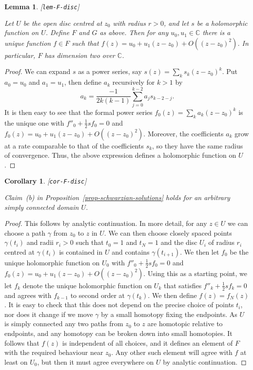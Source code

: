 \documentclass[reqno]{amsart}
\newcommand{\lbl}[1]{\label{#1}\textup{[\texttt{#1}]}\par}
\newcommand{\lbl}{\label}
\newcommand{\gm}        {\gamma}
\newcommand{\C}         {{\mathbb{C}}}
\newcommand{\half}      {\tfrac{1}{2}}
\renewcommand{\:}{\colon}
\newtheorem{lemma}[theorem]{Lemma}
\newtheorem{corollary}[theorem]{Corollary}
\theoremstyle{definition}
\begin{document}
\begin{lemma}\lbl{lem-F-disc}
 Let $U$ be the open disc centred at $z_0$ with radius $r>0$, and let
 $s$ be a holomorphic function on $U$.  Define $F$ and $G$ as above.
 Then for any $u_0,u_1\in\C$ there is a unique function $f\in F$ such
 that $f(z)=u_0+u_1(z-z_0)+O((z-z_0)^2)$.  In particular, $F$ has
 dimension two over $\C$.
\end{lemma}
\begin{proof}
 We can expand $s$ as a power series, say $s(z)=\sum_ks_k(z-z_0)^k$.
 Put $a_0=u_0$ and $a_1=u_1$, then define $a_k$ recursively for $k>1$
 by
 \[ a_k = \frac{-1}{2k(k-1)}\sum_{j=0}^{k-2}a_js_{k-2-j}. \] It is
 then easy to see that the formal power series
 $f_0(z)=\sum_ka_k(z-z_0)^k$ is the unique one with $f''_0+\half
 sf_0=0$ and $f_0(z)=u_0+u_1(z-z_0)+O((z-z_0)^2)$.  Moreover, the
 coefficients $a_k$ grow at a rate comparable to that of the
 coefficients $s_k$, so they have the same radius of convergence.
 Thus, the above expression defines a holomorphic function on $U$.
\end{proof}

\begin{corollary}\lbl{cor-F-disc}
 Claim~(b) in Proposition~\ref{prop-schwarzian-solutions} holds for
 an arbitrary simply connected domain $U$.
\end{corollary}
\begin{proof}
 This follows by analytic continuation.  In more detail, for any
 $z\in U$ we can choose a path $\gm$ from $z_0$ to $z$ in $U$.  We can
 then choose closely spaced points $\gm(t_i)$ and radii $r_i>0$ such
 that $t_0=1$ and $t_N=1$ and the disc $U_i$ of radius $r_i$ centred
 at $\gm(t_i)$ is contained in $U$ and contains $\gm(t_{i+1})$.  We
 then let $f_0$ be the unique holomorphic function on $U_0$ with
 $f''_0+\half sf_0=0$ and $f_0(z)=u_0+u_1(z-z_0)+O((z-z_0)^2)$.  Using
 this as a starting point, we let $f_k$ denote the unique holomorphic
 function on $U_k$ that satisfies $f''_k+\half sf_k=0$ and agrees with
 $f_{k-1}$ to second order at $\gm(t_k)$.  We then define
 $f(z)=f_N(z)$.  It is easy to check that this does not depend on the
 precise choice of points $t_i$, nor does it change if we move $\gm$
 by a small homotopy fixing the endpoints.  As $U$ is simply connected
 any two paths from $z_0$ to $z$ are homotopic relative to endpoints,
 and any homotopy can be broken down into small homotopies.  It
 follows that $f(z)$ is independent of all choices, and it defines an
 element of $F$ with the required behaviour near $z_0$.  Any other
 such element will agree with $f$ at least on $U_0$, but then it must
 agree everywhere on $U$ by analytic continuation.
\end{proof}
\end{document}

